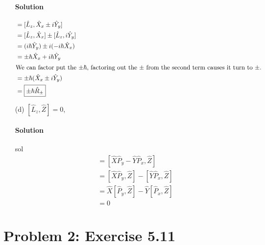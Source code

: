 \documentclass{article}
\begin{document}
\begin{enumerate}
		\paragraph{Solution} 
		\begin{align}
			[\hat{L}_z, \hat{R}_\pm] &= [\hat{L}_z, \hat{X}_x \pm i\hat{Y}_y] \\
									 &= [\hat{L}_z,\hat{X}_x] \pm [\hat{L}_z,i\hat{Y}_y] \\
									 &= (i\hbar\hat{Y}_y) \pm i(-i\hbar\hat{X}_x) \\
									 &= \pm \hbar\hat{X}_x + i\hbar\hat{Y}_y \\
									 \intertext{We can factor put the $\pm\hbar$, factoring out the $\pm$ from the second term causes it turn to $\pm$.}
									 &= \pm \hbar ( \hat{X}_x \pm i\hat{Y}_y ) \\
									 &= \boxed{\pm \hbar \hat{R}_\pm}
		\end{align}
		
		
		
		\item[(d)] $[\hat{L}_z, \hat{Z}] = 0$,
		\paragraph{Solution} sol
		\begin{align}
			[\hat{L}_z, \hat{Z}] &= [\hat{X} \hat{P}_y - \hat{Y} \hat{P}_x, \hat{Z}] \\
								 &= [\hat{X} \hat{P}_y, \hat{Z}] - [\hat{Y} \hat{P}_x, \hat{Z}] \\
								 &= \hat{X}[\hat{P}_y, \hat{Z}] - \hat{Y}[\hat{P}_x, \hat{Z}] \\
								 &= \boxed{0}
		\end{align}
		
	\end{enumerate}	
	
\clearpage
	
	\section*{Problem 2: Exercise 5.11}
	
\end{document}
